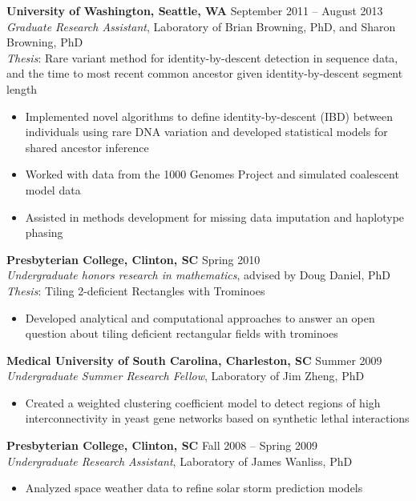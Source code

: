 \documentclass[11pt]{article}
\begin{document}
\textbf{University of Washington, Seattle, WA} \hfill September 2011 -- August 2013 \\
\emph{Graduate Research Assistant}, Laboratory of Brian Browning, PhD, and Sharon Browning, PhD \\
\emph{Thesis}: Rare variant method for identity-by-descent detection in sequence data, and the time to most recent common ancestor given identity-by-descent segment length
\begin{itemize}
	\item Implemented novel algorithms to define identity-by-descent (IBD) between individuals using rare DNA variation and developed statistical models for shared ancestor inference
	\item Worked with data from the 1000 Genomes Project and simulated coalescent model data
	\item Assisted in methods development for missing data imputation and haplotype phasing
\end{itemize}

\bigskip

\textbf{Presbyterian College, Clinton, SC} \hfill Spring 2010 \\
\emph{Undergraduate honors research in mathematics}, advised by Doug Daniel, PhD \\
\emph{Thesis}: Tiling 2-deficient Rectangles with Trominoes
\begin{itemize}
	\item Developed analytical and computational approaches to answer an open question about tiling deficient rectangular fields with trominoes
\end{itemize}

\bigskip

\textbf{Medical University of South Carolina, Charleston, SC} \hfill Summer 2009\\
\emph{Undergraduate Summer Research Fellow}, Laboratory of Jim Zheng, PhD
\begin{itemize}
	\item Created a weighted clustering coefficient model to detect regions of high interconnectivity in yeast gene networks based on synthetic lethal interactions
\end{itemize}

\bigskip

\textbf{Presbyterian College, Clinton, SC} \hfill Fall 2008 -- Spring 2009 \\
\emph{Undergraduate Research Assistant}, Laboratory of James Wanliss, PhD
\begin{itemize}
	\item Analyzed space weather data to refine solar storm prediction models
\end{itemize}
\end{document}

